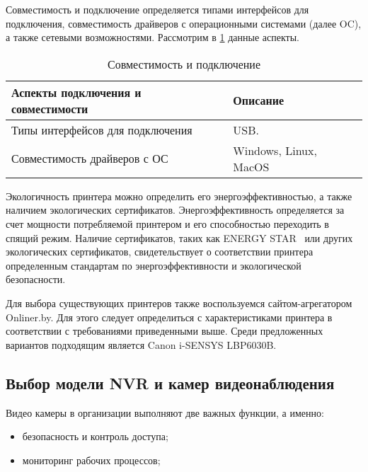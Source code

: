 Совместимость и подключение определяется типами интерфейсов для подключения, совместимость драйверов с операционными 
системами (далее OC), а также сетевыми возможностями.
Рассмотрим в \ref{table:func:printersConnectionProperty} данные аспекты.

\begin{table}[ht]
    \caption{Совместимость и подключение}
    \label{table:func:printersConnectionProperty}
    \begin{tabular}{| >{\raggedright}m{}
                    | >{\raggedright\arraybackslash}m{}|}
        \hline
        \centering Аспекты подключения и совместимости & \centering\arraybackslash Описание \\

        \hline
        Типы интерфейсов для подключения &
        USB.
        \\
        \hline
        Совместимость драйверов с ОС &
        Windows, Linux, MacOS
        \\
        \hline
    \end{tabular}
\end{table}

Экологичность принтера можно определить его энергоэффективностью, а также наличием экологических сертификатов. 
Энергоэффективность определяется за счет мощности потребляемой принтером и его способностью переходить в спящий режим. 
Наличие сертификатов, таких как ENERGY STAR~\cite{energystar} или других экологических сертификатов, свидетельствует о соответствии принтера 
определенным стандартам по энергоэффективности и экологической безопасности.

Для выбора существующих принтеров также воспользуемся сайтом-агрегатором Onliner.by. Для этого следует определиться с характеристиками
принтера в соответствии с требованиями приведенными выше. Среди предложенных вариантов подходящим является Canon i-SENSYS LBP6030B.

\subsection{Выбор модели NVR и камер видеонаблюдения}

Видео камеры в организации выполняют две важных функции, а именно:
\begin{itemize}
    \item безопасность и контроль доступа;
    \item мониторинг рабочих процессов;
\end{itemize}

